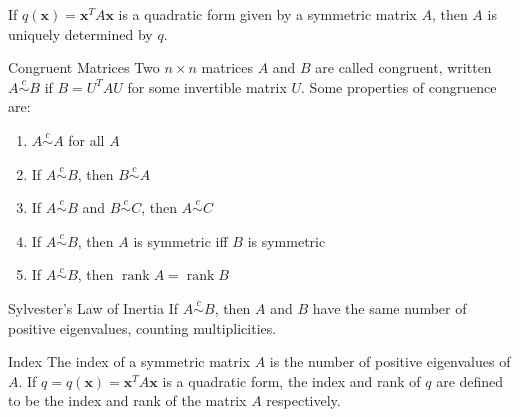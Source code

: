 \documentclass[12pt]{article}
\begin{document}
\begin{theorem}{}{}
    If $ q \left( \mathbf{x} \right) = \mathbf{x}^T A \mathbf{x} $ is a quadratic form given by a symmetric matrix $ A $, then $ A $ is uniquely determined by $ q $.
\end{theorem}

\begin{definition}{Congruent Matrices}{}
    Two $ n \times n $ matrices $ A $ and $ B $ are called congruent, written $ A \overset{c}{\sim} B $ if $ B = U^T AU $ for some invertible matrix $ U $. Some properties of congruence are:
    \begin{enumerate}[label=(\roman*)]
        \item $ A \overset{c}{\sim} A $ for all $ A $
        \item If $ A \overset{c}{\sim} B $, then $ B \overset{c}{\sim} A $
        \item If $ A \overset{c}{\sim} B $ and $ B \overset{c}{\sim} C $, then $ A \overset{c}{\sim} C $
        \item If $ A \overset{c}{\sim} B $, then $ A $ is symmetric iff $ B $ is symmetric
        \item If $ A \overset{c}{\sim} B $, then $ \operatorname{rank} A = \operatorname{rank} B $
    \end{enumerate}
\end{definition}

\begin{theorem}{Sylvester's Law of Inertia}{}
    If $ A \overset{c}{\sim} B $, then $ A $ and $ B $ have the same number of positive eigenvalues, counting multiplicities.
\end{theorem}

\begin{definition}{Index}{}
    The index of a symmetric matrix $ A $ is the number of positive eigenvalues of $ A $. If $ q = q \left( \mathbf{x} \right) = \mathbf{x}^T A \mathbf{x} $ is a quadratic form, the index and rank of $ q $ are defined to be the index and rank of the matrix $ A $ respectively.
\end{definition}
\end{document}
